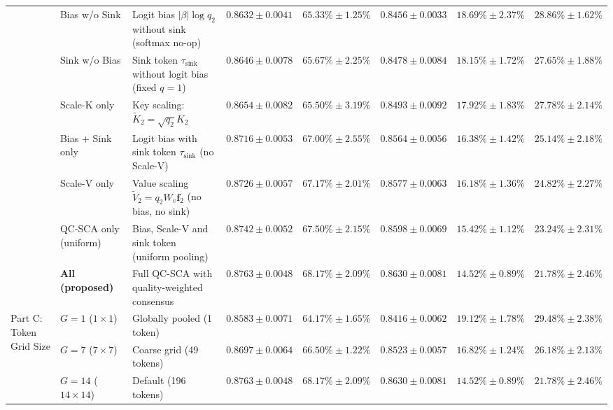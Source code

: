\documentclass[final,5p,times,twocolumn,authoryear]{elsarticle}
\theoremstyle{plain}
\theoremstyle{remark}
\begin{document}
\begin{table}[!tb]
{\begin{tabular}{llp{4.6cm}ccccc}
  & Bias w/o Sink            & Logit bias $|\beta|\log q_2$ without sink (softmax no-op)       & $0.8632 \pm 0.0041$ & $65.33\% \pm 1.25\%$ & $0.8456 \pm 0.0033$ & $18.69\% \pm 2.37\%$ & $28.86\% \pm 1.62\%$ \\
  & Sink w/o Bias            & Sink token $\tau_{\text{sink}}$ without logit bias (fixed $q=1$) & $0.8646 \pm 0.0078$ & $65.67\% \pm 2.25\%$ & $0.8478 \pm 0.0084$ & $18.15\% \pm 1.72\%$ & $27.65\% \pm 1.88\%$ \\
  & Scale-K only             & Key scaling: $\tilde{K}_2 = \sqrt{q_2} K_2$                     & $0.8654 \pm 0.0082$ & $65.50\% \pm 3.19\%$ & $0.8493 \pm 0.0092$ & $17.92\% \pm 1.83\%$ & $27.78\% \pm 2.14\%$ \\
  & Bias + Sink only         & Logit bias with sink token $\tau_{\text{sink}}$ (no Scale-V)    & $0.8716 \pm 0.0053$ & $67.00\% \pm 2.55\%$ & $0.8564 \pm 0.0056$ & $16.38\% \pm 1.42\%$ & $25.14\% \pm 2.18\%$ \\
  & Scale-V only             & Value scaling $\tilde{V}_2 = q_2 W_v \mathbf{f}_2$ (no bias, no sink) & $0.8726 \pm 0.0057$ & $67.17\% \pm 2.01\%$ & $0.8577 \pm 0.0063$ & $16.18\% \pm 1.36\%$ & $24.82\% \pm 2.27\%$ \\
  & QC-SCA only (uniform)    & Bias, Scale-V and sink token (uniform pooling)                  & $0.8742 \pm 0.0052$ & $67.50\% \pm 2.15\%$ & $0.8598 \pm 0.0069$ & $15.42\% \pm 1.12\%$ & $23.24\% \pm 2.31\%$ \\
  & \textbf{All (proposed)}  & Full QC-SCA with quality-weighted consensus                     & $\mathbf{0.8763 \pm 0.0048}$ & $\mathbf{68.17\% \pm 2.09\%}$ & $\mathbf{0.8630 \pm 0.0081}$ & $\mathbf{14.52\% \pm 0.89\%}$ & $\mathbf{21.78\% \pm 2.46\%}$ \\
\midrule
\multirow{4}{*}{Part C: Token Grid Size}
  & $G = 1$ ($1 \times 1$)    & Globally pooled (1 token)                                       & $0.8583 \pm 0.0071$ & $64.17\% \pm 1.65\%$ & $0.8416 \pm 0.0062$ & $19.12\% \pm 1.78\%$ & $29.48\% \pm 2.38\%$ \\
  & $G = 7$ ($7 \times 7$)    & Coarse grid (49 tokens)                                         & $0.8697 \pm 0.0064$ & $66.50\% \pm 1.22\%$ & $0.8523 \pm 0.0057$ & $16.82\% \pm 1.24\%$ & $26.18\% \pm 2.13\%$ \\
  & $G = 14$ ($14 \times 14$) & Default (196 tokens)                                            & $0.8763 \pm 0.0048$ & $68.17\% \pm 2.09\%$ & $0.8630 \pm 0.0081$ & $14.52\% \pm 0.89\%$ & $21.78\% \pm 2.46\%$ \\

\end{tabular}}
\end{table}
\end{document}
